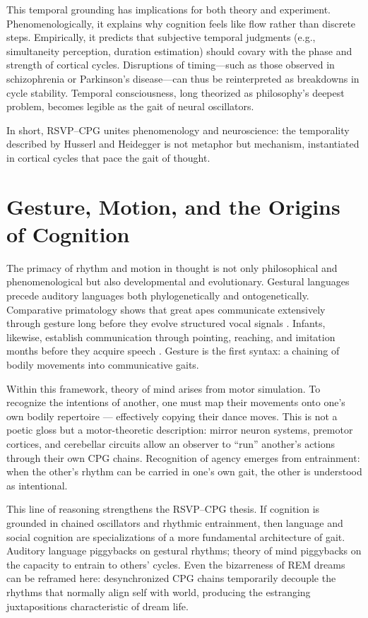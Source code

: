 \documentclass{article}
\begin{document}
This temporal grounding has implications for both theory and experiment. Phenomenologically, it explains why cognition feels like flow rather than discrete steps. Empirically, it predicts that subjective temporal judgments (e.g., simultaneity perception, duration estimation) should covary with the phase and strength of cortical cycles. Disruptions of timing—such as those observed in schizophrenia or Parkinson’s disease—can thus be reinterpreted as breakdowns in cycle stability. Temporal consciousness, long theorized as philosophy’s deepest problem, becomes legible as the gait of neural oscillators.

In short, RSVP--CPG unites phenomenology and neuroscience: the temporality described by Husserl and Heidegger is not metaphor but mechanism, instantiated in cortical cycles that pace the gait of thought.


\section{Gesture, Motion, and the Origins of Cognition}

The primacy of rhythm and motion in thought is not only philosophical and phenomenological but also developmental and evolutionary. Gestural languages precede auditory languages both phylogenetically and ontogenetically. Comparative primatology shows that great apes communicate extensively through gesture long before they evolve structured vocal signals \citep{tomasello2008origins}. Infants, likewise, establish communication through pointing, reaching, and imitation months before they acquire speech \citep{goldin2003language}. Gesture is the first syntax: a chaining of bodily movements into communicative gaits.

Within this framework, theory of mind arises from motor simulation. To recognize the intentions of another, one must map their movements onto one’s own bodily repertoire — effectively copying their dance moves. This is not a poetic gloss but a motor-theoretic description: mirror neuron systems, premotor cortices, and cerebellar circuits allow an observer to “run” another’s actions through their own CPG chains. Recognition of agency emerges from entrainment: when the other’s rhythm can be carried in one’s own gait, the other is understood as intentional.

This line of reasoning strengthens the RSVP--CPG thesis. If cognition is grounded in chained oscillators and rhythmic entrainment, then language and social cognition are specializations of a more fundamental architecture of gait. Auditory language piggybacks on gestural rhythms; theory of mind piggybacks on the capacity to entrain to others’ cycles. Even the bizarreness of REM dreams can be reframed here: desynchronized CPG chains temporarily decouple the rhythms that normally align self with world, producing the estranging juxtapositions characteristic of dream life.
\end{document}
